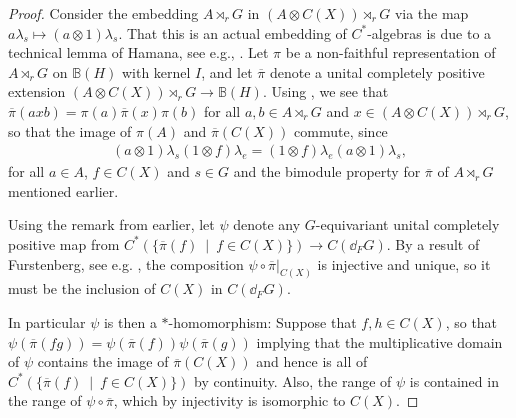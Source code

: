 \begin{proof}
	Consider the embedding $A \rtimes_r G$ in $(A \otimes C(X)) \rtimes_r G$ via the map $a \lambda_s \mapsto (a \otimes 1) \lambda_s$. That this is an actual embedding of $C^*$-algebras is due to a technical lemma of Hamana, see e.g., \cite[lemma 3.1]{hamana1979injective}. Let $\pi$ be a non-faithful representation of $A \rtimes_r G$ on $\mathbb{B}(H)$ with kernel $I$, and let $\overline \pi$ denote a unital completely positive extension $(A \otimes C(X)) \rtimes_r G \to \mathbb{B}(H)$. Using \cite[Proposition 1.5.6]{brown2008c}, we see that $\overline \pi(axb) = \pi(a) \overline \pi(x) \pi(b)$ for all $a,b \in A \rtimes_r G$ and $x \in (A \otimes C(X)) \rtimes_r G$, so that the image of $\pi(A)$ and $\overline \pi(C(X))$ commute, since
	\begin{align*}
		(a \otimes 1 )\lambda_s (1 \otimes f ) \lambda_e = (1 \otimes f) \lambda_e (a \otimes 1) \lambda_s,
	\end{align*}
	for all $ a \in A$, $f \in C(X)$ and $s \in G$ and the bimodule property for $\overline \pi$ of $A \rtimes_r G$ mentioned earlier. 

	Using the remark from earlier, let $\psi$ denote any $G$-equivariant unital completely positive map from $C^*(\{\overline \pi (f) \ \mid \ f \in C(X) \}) \to C(\dd_F G)$. By a result of Furstenberg, see e.g. \cite[lemma 4.16 + proposition 4.23]{bscp}, the composition $\psi \circ \overline \pi|_{C(X)}$ is injective and unique, so it must be the inclusion of $C(X)$ in $C(\dd_F G)$. 
	
	In particular $\psi$ is then a $*$-homomorphism: Suppose that $f,h \in C(X)$, so that $\psi ( \overline \pi(fg))= \psi (\overline \pi(f)) \psi ( \overline \pi(g))$ implying that the multiplicative domain of $\psi$ contains the image of $\overline \pi(C(X))$ and hence is all of $C^*(\{\overline \pi(f) \ \mid \ f \in C(X)\})$ by continuity. Also, the range of $\psi$ is contained in the range of $\psi \circ \overline \pi$, which by injectivity is isomorphic to $C(X)$.


\end{proof}
